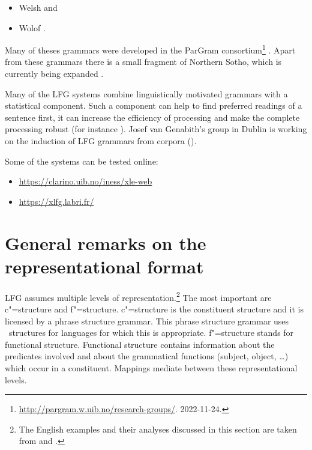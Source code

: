 \begin{itemize}
\item Welsh \citep{MS2005a-u}
and
\item Wolof \citep{Dione2012b-u,Dione2013a-u}.
\end{itemize}
Many of theses grammars were developed in the ParGram consortium\footnote{%
  \url{http://pargram.w.uib.no/research-groups/}. 2022-11-24.
} \citep*{BKNS99a-ed,BDKMR02a-u}. Apart from these grammars there is a small fragment of Northern
Sotho, which is currently being expanded \citep{Faasz2010a-u}. 


Many of the LFG systems combine linguistically motivated grammars with a statistical
component. Such a component can help to find preferred readings of a sentence first,
it can increase the efficiency of processing and make the complete processing robust (for instance
\citealp{KRKMVC2004a-u,RKKCMJ2002a-u}). Josef van Genabith's group in Dublin is working on the induction of
LFG grammars from corpora (\eg \citealp{JGCCR99a-u,DBCGW2005a-u,CBFDRCW2005a-u,CG2006a-u,GWG2007a-u,CBDRGW2008a-u,SvG2009a-u}). 

\pagebreak
Some of the systems can be tested online:
\begin{itemize}
\item \url{https://clarino.uib.no/iness/xle-web}

\item \url{https://xlfg.labri.fr/}
\end{itemize}




\section{General remarks on the representational format}
\label{Abschnitt-Format-LFG}

LFG assumes multiple levels of representation.\footnote{%
	The English examples and their analyses discussed in this section are taken from
        \citet{Dalrymple2001a-u} and \citet{Dalrymple2006a}.
} The most important are c"=structure and f"=structure. c"=structure is the constituent
structure and it is licensed by a phrase structure grammar. This phrase structure grammar uses
\xbar~structures for languages for which this is appropriate. f"=structure stands for functional structure. Functional structure contains information about the predicates involved
and about the grammatical functions (subject, object, \ldots) which occur in a constituent. Mappings
mediate between these representational levels.


